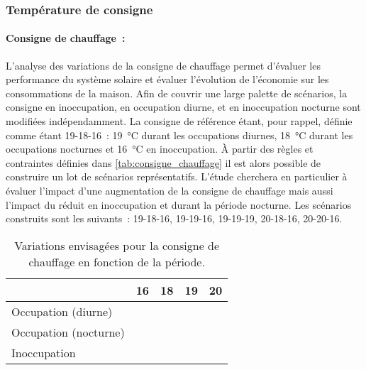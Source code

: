 \subsubsection{Température de consigne} %
\label{ssub:temperature_de_consigne}
\paragraph{Consigne de chauffage~:} %
\label{par:consigne_de_chauffage}
L’analyse des variations de la consigne de chauffage permet d’évaluer les performance du
système solaire et évaluer l’évolution de l’économie sur les consommations de la maison.
Afin de couvrir une large palette de scénarios, la consigne en inoccupation, en occupation
diurne, et en inoccupation nocturne sont modifiées indépendamment. La consigne de
référence étant, pour rappel, définie comme étant 19-18-16~: \SI{19}{\celsius} durant les
occupations diurnes, \SI{18}{\celsius} durant les occupations nocturnes et
\SI{16}{\celsius} en inoccupation. À partir des règles et contraintes définies dans
\autoref{tab:consigne_chauffage} il est alors possible de construire un lot de scénarios
représentatifs. L’étude cherchera en particulier à évaluer l’impact d’une augmentation de
la consigne de chauffage mais aussi l’impact du réduit en inoccupation et durant la
période nocturne. Les scénarios construits sont les suivants~: 19-18-16, 19-19-16,
19-19-19, 20-18-16, 20-20-16.

\begin{table}
\centering
\begin{tabular}{l c c c c}
    \toprule
                    & \bf{16}             & \bf{18}             & \bf{19}             & \bf{20}              \\
    \midrule
    Occupation (diurne)    &                     &                     & \cellcolor{SolarizedBrBlue} & \cellcolor{SolarizedBrBlue} \\
    Occupation (nocturne)  &                     & \cellcolor{SolarizedBrBlue} & \cellcolor{SolarizedBrBlue} & \cellcolor{SolarizedBrBlue} \\
    Inoccupation         & \cellcolor{SolarizedBrBlue} &                     & \cellcolor{SolarizedBrBlue} &                     \\
    \bottomrule
\end{tabular}
\caption{Variations envisagées pour la consigne de chauffage en fonction de la période.}
         \label{tab:consigne_chauffage}
\end{table}


